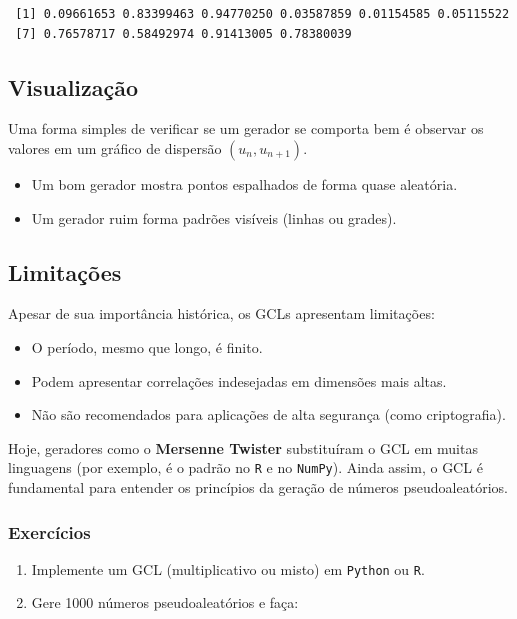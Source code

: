 \documentclass[
  letterpaper,
  DIV=11,
  numbers=noendperiod]{scrreprt}
\begin{document}
\begin{verbatim}
 [1] 0.09661653 0.83399463 0.94770250 0.03587859 0.01154585 0.05115522
 [7] 0.76578717 0.58492974 0.91413005 0.78380039
\end{verbatim}

\subsection*{Visualização}\label{visualizauxe7uxe3o}

Uma forma simples de verificar se um gerador se comporta bem é observar
os valores em um gráfico de dispersão \((u_{n}, u_{n+1}).\)

\begin{itemize}
\item
  Um bom gerador mostra pontos espalhados de forma quase aleatória.
\item
  Um gerador ruim forma padrões visíveis (linhas ou grades).
\end{itemize}

\subsection*{Limitações}\label{limitauxe7uxf5es}

Apesar de sua importância histórica, os GCLs apresentam limitações:

\begin{itemize}
\item
  O período, mesmo que longo, é finito.
\item
  Podem apresentar correlações indesejadas em dimensões mais altas.
\item
  Não são recomendados para aplicações de alta segurança (como
  criptografia).
\end{itemize}

Hoje, geradores como o \textbf{Mersenne Twister} substituíram o GCL em
muitas linguagens (por exemplo, é o padrão no \texttt{R} e no
\texttt{NumPy}). Ainda assim, o GCL é fundamental para entender os
princípios da geração de números pseudoaleatórios.

\subsubsection*{Exercícios}\label{exercuxedcios-5}

\begin{enumerate}
\def\labelenumi{\arabic{enumi}.}
\item
  Implemente um GCL (multiplicativo ou misto) em \texttt{Python} ou
  \texttt{R}.
\item
  Gere 1000 números pseudoaleatórios e faça:
\end{enumerate}
\end{document}
